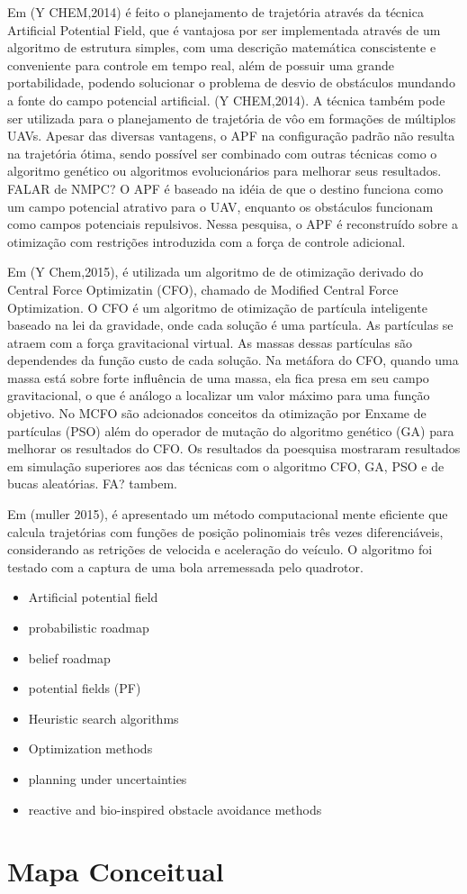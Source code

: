 Em (Y CHEM,2014) é feito o planejamento de trajetória através da técnica Artificial Potential Field, que é vantajosa por ser implementada através de um algoritmo de estrutura simples, com uma descrição matemática conscistente e conveniente para controle em tempo real, além de possuir uma grande portabilidade, podendo solucionar o problema de desvio de obstáculos mundando a fonte do campo potencial artificial. (Y CHEM,2014). A técnica também pode ser utilizada para o planejamento de trajetória de vôo em formações de múltiplos UAVs. Apesar das diversas vantagens, o APF na configuração padrão não resulta na trajetória ótima, sendo possível ser combinado com outras técnicas como o algoritmo genético ou algoritmos evolucionários para melhorar seus resultados. FALAR de NMPC? O APF é baseado na idéia de que o destino funciona como um campo potencial atrativo para o UAV, enquanto os obstáculos funcionam como campos potenciais repulsivos. Nessa pesquisa, o APF é reconstruído sobre a otimização com restrições introduzida com a força de controle adicional.

Em (Y Chem,2015), é utilizada um algoritmo de de otimização derivado do Central Force Optimizatin (CFO), chamado de Modified Central Force Optimization. O CFO é um algoritmo de otimização de partícula inteligente baseado na lei da gravidade, onde cada solução é uma partícula. As partículas se atraem com a força gravitacional virtual. As massas dessas partículas são dependendes da função custo de cada solução. Na metáfora do CFO, quando uma massa está sobre forte influência de uma massa, ela fica presa em seu campo gravitacional, o que é análogo a localizar um valor máximo para uma função objetivo.
No MCFO são adcionados conceitos da otimização por Enxame de partículas (PSO) além do operador de mutação do algoritmo genético (GA) para melhorar os resultados do CFO. Os resultados da poesquisa mostraram resultados em simulação superiores aos das técnicas com o algoritmo CFO, GA, PSO e de bucas aleatórias. FA? tambem.

Em (muller 2015), é apresentado um método computacional mente eficiente que calcula trajetórias com funções de posição polinomiais três vezes diferenciáveis, considerando as retrições de velocida e aceleração do veículo. O algoritmo foi testado com a captura de uma bola arremessada pelo quadrotor.
 
\begin{itemize}
    \item Artificial potential field
    \item probabilistic roadmap
    \item belief roadmap
    \item potential fields (PF)
    \item Heuristic search algorithms
    \item Optimization methods
    \item planning under uncertainties
    \item reactive and bio-inspired obstacle avoidance methods
\end{itemize}



\section{Mapa Conceitual}
